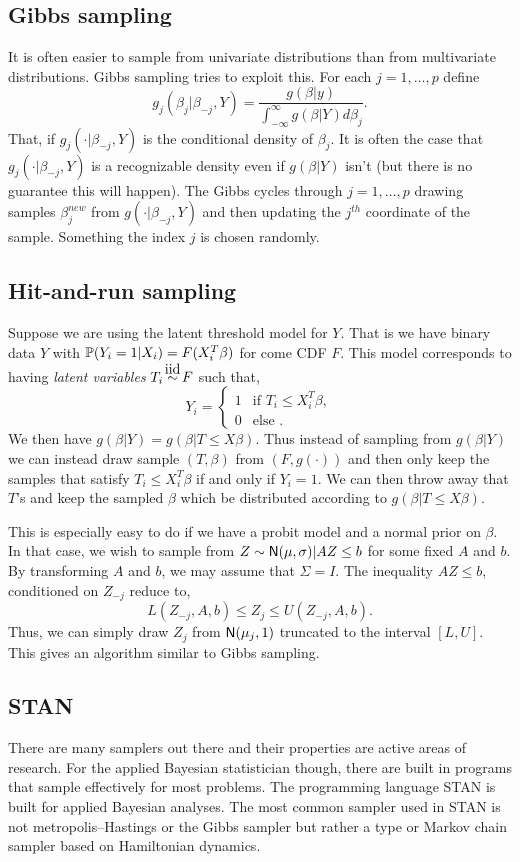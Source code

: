 \subsection{Gibbs sampling}
It is often easier to sample from univariate distributions than from multivariate distributions. Gibbs sampling tries to exploit this. For each $j=1,\ldots,p$ define
\[g_j(\beta_j|\beta_{-j},Y) = \frac{g(\beta|y)}{\int_{-\infty}^\infty g(\beta|Y)d\beta_j}. \]
That, if $g_j(\cdot|\beta_{-j},Y)$ is the conditional density of $\beta_j$. It is often the case that $g_j(\cdot|\beta_{-j},Y)$ is a recognizable density even if $g(\beta|Y)$ isn't (but there is no guarantee this will happen). The Gibbs cycles through $j=1,\ldots,p$ drawing samples $\beta_j^{new}$ from $g(\cdot|\beta_{-j},Y)$ and then updating the $j^{th}$ coordinate of the sample. Something the index $j$ is chosen randomly.

\subsection{Hit-and-run sampling}
Suppose we are using the latent threshold model for $Y$. That is we have binary data $Y$ with ${\mathbb{P}}(Y_i=1|X_i) = F(X_i^T\beta)$ for come CDF $F$. This model corresponds to having \emph{latent variables} $T_i \iid F$ such that,
\[Y_i = \begin{cases}
    1 & \text{if } T_i \le X_i^T\beta,\\
    0 & \text{else }.
\end{cases} \] 
We then have $g(\beta|Y) = g(\beta|T \le X\beta)$. Thus instead of sampling from $g(\beta|Y)$ we can instead draw sample $(T,\beta)$ from $(F,g(\cdot))$ and then only keep the samples that satisfy $T_i \le X_i^T\beta$ if and only if $Y_i = 1$. We can then throw away that $T$'s and keep the sampled $\beta$ which be distributed according to $g(\beta|T\le X\beta)$.  

This is especially easy to do if we have a probit model and a normal prior on $\beta$. In that case, we wish to sample from $Z \sim \mathsf{N}(\mu,\sigma)|AZ\le b$ for some fixed $A$ and $b$. By transforming $A$ and $b$, we may assume that $\Sigma = I$. The inequality $AZ\le b$, conditioned on $Z_{-j}$ reduce to,
\[L(Z_{-j}, A, b) \le Z_j \le U(Z_{-j},A,b). \]
Thus, we can simply draw $Z_j$ from $\mathsf{N}(\mu_j,1)$ truncated to the interval $[L,U]$. This gives an algorithm similar to Gibbs sampling.

\subsection{STAN}
There are many samplers out there and their properties are active areas of research. For the applied Bayesian statistician though, there are built in programs that sample effectively for most problems. The programming language STAN is built for applied Bayesian analyses. The most common sampler used in STAN is not metropolis--Hastings or the Gibbs sampler but rather a type or Markov chain sampler based on Hamiltonian dynamics. 

